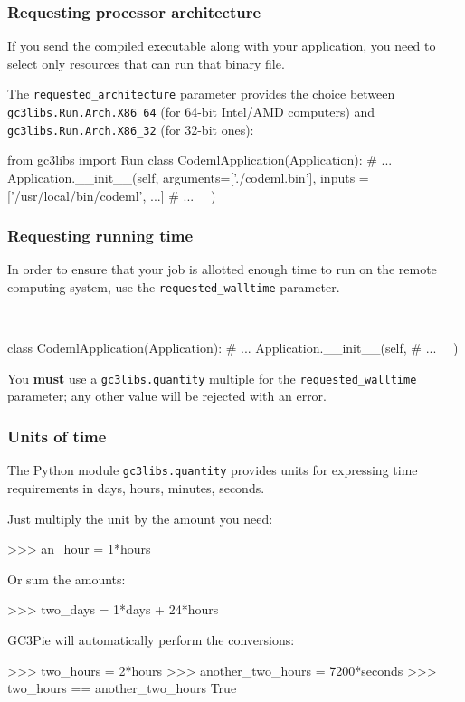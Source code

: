 \documentclass[english,serif,mathserif,xcolor=pdftex,dvipsnames,table]{beamer}
\begin{document}
\begin{frame}[fragile]
  \frametitle{Requesting processor architecture}

  If you send the compiled executable along with your application, you
  need to select only resources that can run that binary file.

  \+
  The \lstinline|requested_architecture| parameter provides the
  choice between \lstinline|gc3libs.Run.Arch.X86_64| (for 64-bit
  Intel/AMD computers) and \lstinline|gc3libs.Run.Arch.X86_32| (for
  32-bit ones):
  \begin{python}
  from gc3libs import Run
  class CodemlApplication(Application):
    # ...
    Application.__init__(self,
      arguments=['./codeml.bin'],
      inputs = ['/usr/local/bin/codeml', ...]
      # ...
      ~~)
  \end{python}
\end{frame}


\begin{frame}[fragile]
  \frametitle{Requesting running time}

  In order to ensure that your job is allotted enough time to run on
  the remote computing system, use the \lstinline|requested_walltime|
  parameter.

  \+
  \begin{python}
  ~~ \
    ~~

  class CodemlApplication(Application):
    # ...
    Application.__init__(self,
      # ...
      ~~)
  \end{python}

  \+
  You \textbf{must} use a \texttt{gc3libs.quantity} multiple for the
  \lstinline|requested_walltime| parameter; any other value will be
  rejected with an error.
\end{frame}

\begin{frame}[fragile]
  \frametitle{Units of time}
  The Python module \texttt{gc3libs.quantity} provides units for
  expressing time requirements in days, hours, minutes, seconds.

  \+
  Just multiply the unit by the amount you need:
  \begin{python}
    >>> an_hour = 1*hours
  \end{python}
  Or sum the amounts:
  \begin{python}
    >>> two_days = 1*days + 24*hours
  \end{python}

  \+
  GC3Pie will automatically perform the conversions:
  \begin{python}
    >>> two_hours = 2*hours
    >>> another_two_hours = 7200*seconds
    >>> two_hours == another_two_hours
    True
  \end{python}
\end{frame}
\end{document}
